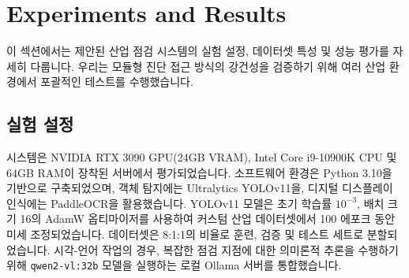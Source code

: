 \section{Experiments and Results}
\label{sec:experiments}

이 섹션에서는 제안된 산업 점검 시스템의 실험 설정, 데이터셋 특성 및 성능 평가를 자세히 다룹니다.
우리는 모듈형 진단 접근 방식의 강건성을 검증하기 위해 여러 산업 환경에서 포괄적인 테스트를 수행했습니다.

\subsection{실험 설정}
시스템은 NVIDIA RTX 3090 GPU(24GB VRAM), Intel Core i9-10900K CPU 및 64GB RAM이 장착된 서버에서 평가되었습니다.
소프트웨어 환경은 Python 3.10을 기반으로 구축되었으며, 객체 탐지에는 Ultralytics YOLOv11을, 디지털 디스플레이 인식에는 PaddleOCR을 활용했습니다.
YOLOv11 모델은 초기 학습률 $10^{-3}$, 배치 크기 16의 AdamW 옵티마이저를 사용하여 커스텀 산업 데이터셋에서 100 에포크 동안 미세 조정되었습니다.
데이터셋은 8:1:1의 비율로 훈련, 검증 및 테스트 세트로 분할되었습니다.
시각-언어 작업의 경우, 복잡한 점검 지점에 대한 의미론적 추론을 수행하기 위해 \texttt{qwen2-vl:32b} 모델을 실행하는 로컬 Ollama 서버를 통합했습니다.

